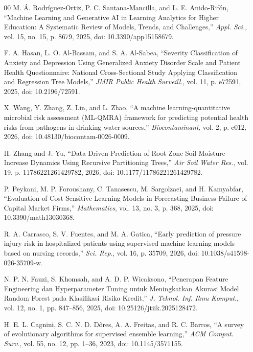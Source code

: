 \documentclass{ieeeaccess}
\begin{document}
\begin{thebibliography}{00}
 M. \'{A}. Rodr\'{i}guez-Ortiz, P. C. Santana-Mancilla, and L. E. Anido-Rif\'{o}n, ``Machine Learning and Generative AI in Learning Analytics for Higher Education: A Systematic Review of Models, Trends, and Challenges,'' \emph{Appl. Sci.}, vol. 15, no. 15, p. 8679, 2025, doi: 10.3390/app15158679.

 F. A. Hasan, L. O. Al-Bassam, and S. A. Al-Sabea, ``Severity Classification of Anxiety and Depression Using Generalized Anxiety Disorder Scale and Patient Health Questionnaire: National Cross-Sectional Study Applying Classification and Regression Tree Models,'' \emph{JMIR Public Health Surveill.}, vol. 11, p. e72591, 2025, doi: 10.2196/72591.

 X. Wang, Y. Zhang, Z. Lin, and L. Zhao, ``A machine learning-quantitative microbial risk assessment (ML-QMRA) framework for predicting potential health risks from pathogens in drinking water sources,'' \emph{Biocontaminant}, vol. 2, p. e012, 2026, doi: 10.48130/biocontam-0026-0009.

 H. Zhang and J. Yu, ``Data-Driven Prediction of Root Zone Soil Moisture Increase Dynamics Using Recursive Partitioning Trees,'' \emph{Air Soil Water Res.}, vol. 19, p. 11786221261429782, 2026, doi: 10.1177/11786221261429782.

 P. Peykani, M. P. Foroushany, C. Tanasescu, M. Sargolzaei, and H. Kamyabfar, ``Evaluation of Cost-Sensitive Learning Models in Forecasting Business Failure of Capital Market Firms,'' \emph{Mathematics}, vol. 13, no. 3, p. 368, 2025, doi: 10.3390/math13030368.

 R. A. Carrasco, S. V. Fuentes, and M. A. Gatica, ``Early prediction of pressure injury risk in hospitalized patients using supervised machine learning models based on nursing records,'' \emph{Sci. Rep.}, vol. 16, p. 35709, 2026, doi: 10.1038/s41598-026-35709-w.

 N. P. N. Fauzi, S. Khomsah, and A. D. P. Wicaksono, ``Penerapan Feature Engineering dan Hyperparameter Tuning untuk Meningkatkan Akurasi Model Random Forest pada Klasifikasi Risiko Kredit,'' \emph{J. Teknol. Inf. Ilmu Komput.}, vol. 12, no. 1, pp. 847--856, 2025, doi: 10.25126/jtiik.2025128472.

 H. E. L. Cagnini, S. C. N. D. D\^{o}res, A. A. Freitas, and R. C. Barros, ``A survey of evolutionary algorithms for supervised ensemble learning,'' \emph{ACM Comput. Surv.}, vol. 55, no. 12, pp. 1--36, 2023, doi: 10.1145/3571155.


\end{thebibliography}
\end{document}
